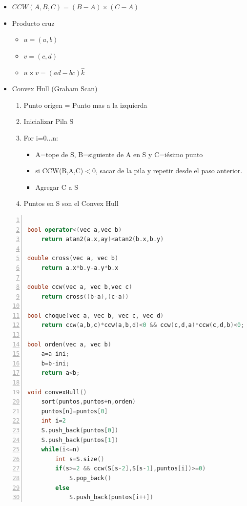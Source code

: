 \documentclass[a4paper,spanish,10pt]{article}
\begin{document}
		\begin{itemize}
			\item{
				$CCW(A,B,C)=(B-A) \times (C-A) $
			}
			\item{
				Producto cruz
				\begin{itemize}
					\item $u=(a,b)$
					\item $v=(c,d)$
					\item $u \times v = (ad-bc)\hat k $
				\end{itemize}
			}
			\item{
				Convex Hull (Graham Scan)
				\begin{enumerate}
					\item Punto origen = Punto mas a la izquierda
					\item Inicializar Pila S
					\item For i=0...n:
						\begin{itemize}
							\item A=tope de S, B=siguiente de A en S y C=i\'esimo punto
							\item si CCW(B,A,C)$<0$, sacar de la pila y repetir desde el paso anterior.
							\item Agregar C a S
						\end{itemize}
					\item Puntos en S son el Convex Hull
				\end{enumerate}
			}
		\end{itemize}

\begin{lstlisting}[language=C++, numbers=left,tabsize=4]

bool operator<(vec a,vec b)
	return atan2(a.x,ay)<atan2(b.x,b.y)

double cross(vec a, vec b)
	return a.x*b.y-a.y*b.x

double ccw(vec a, vec b,vec c)
	return cross((b-a),(c-a))

bool choque(vec a, vec b, vec c, vec d)
	return ccw(a,b,c)*ccw(a,b,d)<0 && ccw(c,d,a)*ccw(c,d,b)<0;

bool orden(vec a, vec b)
	a=a-ini;
	b=b-ini;
	return a<b;

void convexHull()
	sort(puntos,puntos+n,orden)
	puntos[n]=puntos[0]
	int i=2
	S.push_back(puntos[0])
	S.push_back(puntos[1])
	while(i<=n)
		int s=S.size()
		if(s>=2 && ccw(S[s-2],S[s-1],puntos[i])>=0)
			S.pop_back()
		else
			S.push_back(puntos[i++])
\end{lstlisting}
			
\end{document}
